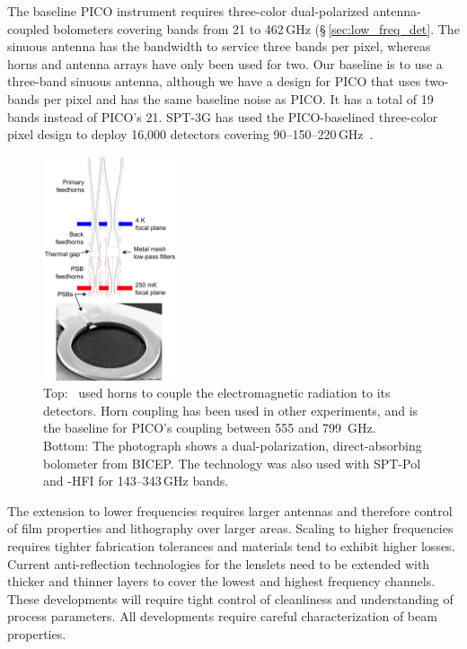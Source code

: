 

The baseline PICO instrument requires three-color dual-polarized antenna-coupled bolometers covering bands from 21 to 462\,GHz
(\S\,\ref{sec:low_freq_det}.  The sinuous antenna has the bandwidth to service three bands per pixel, whereas horns and antenna arrays have only been used for two. Our baseline is to use a three-band sinuous antenna, although we have a design for PICO that uses two-bands per pixel and has the same baseline noise as PICO. It has a total of 19 bands instead of PICO's 21. SPT-3G has used the PICO-baselined three-color pixel design to deploy 16,000 detectors covering 90--150--220\,GHz~\citep{Dutcher2018}.

%
%
\begin{figure}  %
\centering
\vspace{-5pt} %
\includegraphics[width=0.35\textwidth]{figures/DirectAbsorbing.png}  %
\vspace{-0.25in}
\caption{\captiontext Top: \planck\ used horns to couple the electromagnetic radiation to its detectors. Horn coupling has been used in other experiments, and is the baseline for PICO's coupling between 555 and 799~GHz. Bottom: The photograph shows a dual-polarization, direct-absorbing bolometer from BICEP. The technology was also used with SPT-Pol and \planck-HFI for 143--343\,GHz bands.
\label{fig:DirectAbsorbing} }
\end{figure}
%
%
The extension to lower frequencies requires larger antennas and therefore control of film properties and lithography over larger areas. Scaling to higher frequencies requires tighter fabrication tolerances and materials tend to exhibit higher losses. Current anti-reflection technologies for the lenslets need to be extended with thicker and thinner layers to cover the lowest and highest frequency channels. These developments will require tight control of cleanliness and understanding of process parameters. All developments require careful characterization of beam properties.

